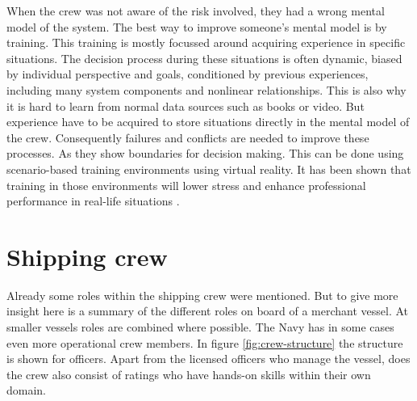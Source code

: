 When the crew was not aware of the risk involved, they had a wrong mental model of the system. The best way to improve someone's mental model is by training. This training is mostly focussed around acquiring experience in specific situations. The decision process during these situations is often dynamic, biased by individual perspective and goals, conditioned by previous experiences, including many system components and nonlinear relationships. This is also why it is hard to learn from normal data sources such as books or video. But experience have to be acquired to store situations directly in the mental model of the crew. Consequently failures and conflicts are needed to improve these processes. As they show boundaries for decision making. This can be done using scenario-based training environments using virtual reality. It has been shown that training in those environments will lower stress and enhance professional performance in real-life situations \cite{Ford1998} \cite{Cohen2016}.

\newpage
\section{Shipping crew}	
Already some roles within the shipping crew were mentioned. But to give more insight here is a summary of the different roles on board of a merchant vessel. At smaller vessels roles are combined where possible. The Navy has in some cases even more operational crew members. In figure \ref{fig:crew-structure} the structure is shown for officers. Apart from the licensed officers who manage the vessel, does the crew also consist of ratings who have hands-on skills within their own domain. \cite{Nedcon2013}

